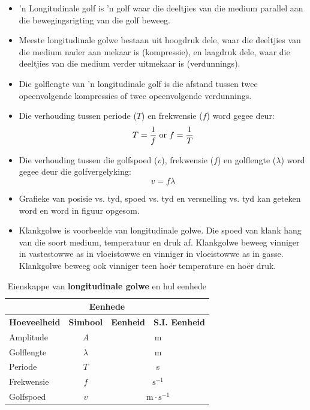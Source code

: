 \nopagebreak
      \label{m38783*id293550}\begin{itemize}[noitemsep] 
            \label{m38783*uid20}\item  'n Longitudinale golf is  'n golf waar die deeltjies van die medium parallel aan die bewegingsrigting van die golf beweeg.
\label{m38783*uid21}\item Meeste longitudinale golwe bestaan uit hoogdruk dele, waar die deeltjies van die medium nader aan mekaar is (kompressie), en laagdruk dele, waar die deeltjies van die medium verder uitmekaar is (verdunnings).
\label{m38783*uid22}\item Die golflengte van  'n longitudinale golf is die afstand tussen twee opeenvolgende kompressies of twee opeenvolgende verdunnings.
\label{m38783*uid23}\item Die verhouding tussen periode ($T$) en frekwensie ($f$) word gegee deur:
\label{m38783*id293619}\nopagebreak\noindent{}
    \begin{equation}\nonumber
    T=\frac{1}{f}\phantom{\rule{3pt}{0ex}}\text{or}\phantom{\rule{3pt}{0ex}}f=\frac{1}{T}
      \end{equation}
    \label{m38783*uid24}\item Die verhouding tussen die golfspoed ($v$), frekwensie ($f$) en golflengte ($\lambda$) word gegee deur die golfvergelyking:
\label{m38783*id293694}\nopagebreak\noindent{}
    \begin{equation}\nonumber
    v=f\lambda
      \end{equation}
    \label{m38783*uid25}\item Grafieke van posisie vs. tyd, spoed vs. tyd en versnelling vs. tyd kan geteken word en word in figuur \label{m38783*uid26} opgesom.
\item Klankgolwe is voorbeelde van longitudinale golwe. Die spoed van klank hang van die soort medium, temperatuur en druk af. Klankgolwe beweeg vinniger in vastestowwe as in vloeistowwe en vinniger in vloeistowwe as in gasse. Klankgolwe beweeg ook vinniger teen ho\"er temperature en ho\"er druk.
\end{itemize}
\begin{table}[H]
\begin{center}
\begin{tabular}{|l|c|c|c|}\hline \hline 
\multicolumn{4}{|c|}{\textbf{Eenhede}}\\ \hline \hline
\textbf{Hoeveelheid} & \textbf{Simbool} & \textbf{Eenheid} & \textbf{S.I. Eenheid}\\ \hline
Amplitude & $A$ & \multicolumn{2}{c|}{m} \\ \hline
Golflengte & $\lambda$ & \multicolumn{2}{c|}{m}  \\ \hline
Periode & $T$ & \multicolumn{2}{c|}{s}  \\ \hline
Frekwensie & $f$ & \multicolumn{2}{c|}{$\text{s}^{-1}$}  \\ \hline
Golfspoed & $v$ & \multicolumn{2}{c|}{$\text{m} \cdot \text{s}^{-1}$} \\ \hline
\end{tabular}
\end{center}
\caption{Eienskappe van \textbf{longitudinale golwe} en hul eenhede}
\label{table:electricity::units}
\end{table}
